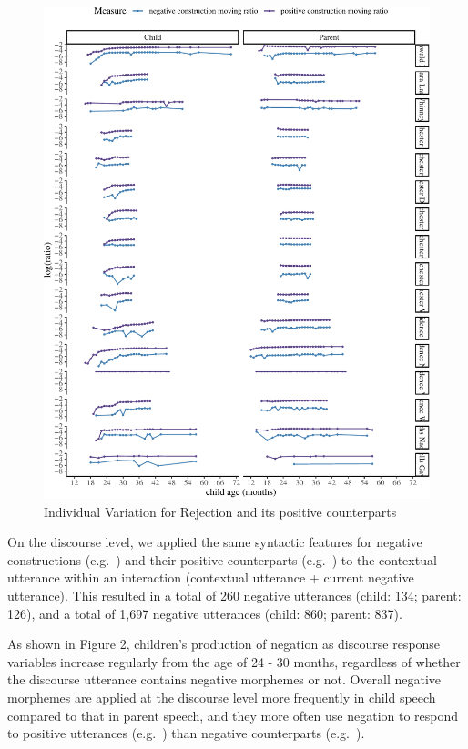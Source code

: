 \documentclass[
  english,
  man,floatsintext]{apa6}
\begin{document}
\begin{figure}[H]

{\centering \includegraphics{neg_construction_article_files/figure-latex/individualemotion-1} 

}

\caption{Individual Variation for  Rejection and its positive counterparts}\label{fig:individualemotion}
\end{figure}

On the discourse level, we applied the same syntactic features for negative constructions (e.g.~) and their positive counterparts (e.g.~) to the contextual utterance within an interaction (contextual utterance + current negative utterance). This resulted in a total of 260 negative utterances (child: 134; parent: 126), and a total of 1,697 negative utterances (child: 860; parent: 837).

As shown in Figure 2, children's production of negation as discourse response variables increase regularly from the age of 24 - 30 months, regardless of whether the discourse utterance contains negative morphemes or not. Overall negative morphemes are applied at the discourse level more frequently in child speech compared to that in parent speech, and they more often use negation to respond to positive utterances (e.g.~) than negative counterparts (e.g.~).
\end{document}
